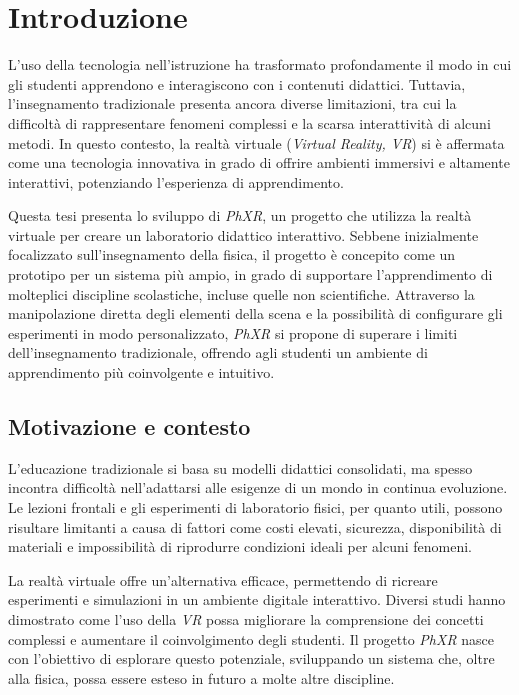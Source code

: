 \chapter{Introduzione}
\label{cha:introduzione}

L'uso della tecnologia nell'istruzione ha trasformato profondamente il modo in
cui gli studenti apprendono e interagiscono con i contenuti didattici. Tuttavia,
l'insegnamento tradizionale presenta ancora diverse limitazioni, tra cui la difficoltà
di rappresentare fenomeni complessi e la scarsa interattività di alcuni metodi.
In questo contesto, la realtà virtuale (\emph{Virtual Reality, VR}) si è
affermata come una tecnologia innovativa in grado di offrire ambienti immersivi
e altamente interattivi, potenziando l'esperienza di apprendimento.

Questa tesi presenta lo sviluppo di \emph{PhXR}, un progetto che utilizza la realtà
virtuale per creare un laboratorio didattico interattivo. Sebbene inizialmente
focalizzato sull'insegnamento della fisica, il progetto è concepito come un prototipo
per un sistema più ampio, in grado di supportare l’apprendimento di molteplici
discipline scolastiche, incluse quelle non scientifiche. Attraverso la
manipolazione diretta degli elementi della scena e la possibilità di configurare
gli esperimenti in modo personalizzato, \emph{PhXR} si propone di superare i
limiti dell’insegnamento tradizionale, offrendo agli studenti un ambiente di apprendimento
più coinvolgente e intuitivo.

\section{Motivazione e contesto}
\label{sec:introduzione_motivazione}

L’educazione tradizionale si basa su modelli didattici consolidati, ma spesso incontra
difficoltà nell’adattarsi alle esigenze di un mondo in continua evoluzione. Le
lezioni frontali e gli esperimenti di laboratorio fisici, per quanto utili,
possono risultare limitanti a causa di fattori come costi elevati, sicurezza,
disponibilità di materiali e impossibilità di riprodurre condizioni ideali per
alcuni fenomeni.

La realtà virtuale offre un'alternativa efficace, permettendo di ricreare esperimenti
e simulazioni in un ambiente digitale interattivo. Diversi studi hanno
dimostrato come l’uso della \emph{VR} possa migliorare la comprensione dei concetti
complessi e aumentare il coinvolgimento degli studenti. Il progetto \emph{PhXR} nasce
con l'obiettivo di esplorare questo potenziale, sviluppando un sistema che, oltre
alla fisica, possa essere esteso in futuro a molte altre discipline.

